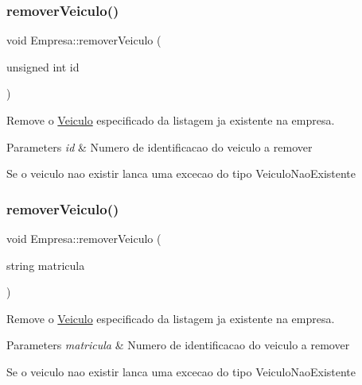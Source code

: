 \subsubsection{\texorpdfstring{remover\+Veiculo()}{removerVeiculo()}\hspace{0.1cm}{\footnotesize\ttfamily [1/2]}}
{\footnotesize\ttfamily void Empresa\+::remover\+Veiculo (\begin{DoxyParamCaption}\item[{unsigned int}]{id }\end{DoxyParamCaption})}



Remove o \mbox{\hyperlink{class_veiculo}{Veiculo}} especificado da listagem ja existente na empresa. 


\begin{DoxyParams}{Parameters}
{\em id} & Numero de identificacao do veiculo a remover\\
\hline
\end{DoxyParams}
Se o veiculo nao existir lanca uma excecao do tipo Veiculo\+Nao\+Existente \mbox{\label{class_empresa_a39f49199e53094afe62e3d4150121f6b}} 
\subsubsection{\texorpdfstring{remover\+Veiculo()}{removerVeiculo()}\hspace{0.1cm}{\footnotesize\ttfamily [2/2]}}
{\footnotesize\ttfamily void Empresa\+::remover\+Veiculo (\begin{DoxyParamCaption}\item[{string}]{matricula }\end{DoxyParamCaption})}



Remove o \mbox{\hyperlink{class_veiculo}{Veiculo}} especificado da listagem ja existente na empresa. 


\begin{DoxyParams}{Parameters}
{\em matricula} & Numero de identificacao do veiculo a remover\\
\hline
\end{DoxyParams}
Se o veiculo nao existir lanca uma excecao do tipo Veiculo\+Nao\+Existente \mbox{\label{class_empresa_a2f3365974dff2a149c1818f9d6783deb}} 
